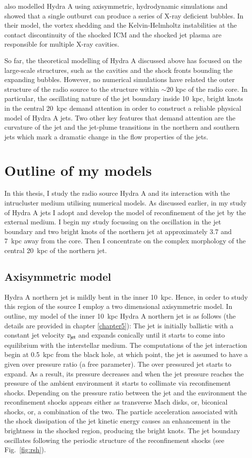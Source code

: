 \citet{rafaelovich12} also modelled Hydra A using axisymmetric, hydrodynamic simulations and showed that a single outburst can produce a series of X-ray deficient bubbles. In their model, the vortex shedding and the Kelvin-Helmholtz instabilities at the contact discontinuity of the shocked ICM and the shocked jet plasma are responsible for multiple X-ray cavities.

So far, the theoretical modelling of Hydra A discussed above has focused on the large-scale structures, such as the cavities and the shock fronts bounding the expanding bubbles. However, no numerical simulations have related the outer structure of the radio source to the structure within $\sim20$ kpc of the radio core. In particular, the oscillating nature of the jet boundary inside 10~kpc, bright knots in the central 20~kpc demand attention in order to construct a reliable physical model of Hydra A jets. Two other key features that demand attention are the curvature of the jet and the jet-plume transitions in the northern and southern jets which mark a dramatic change in the flow properties of the jets.
\section{Outline of my models}\label{int:mod}
In this thesis, I study the radio source Hydra A and its interaction with the intrucluster medium utilising numerical models. As discussed earlier, in my study of Hydra A jets I adopt and develop the model of reconfinement of the jet by the external medium. I begin my study focussing on the oscillation in the jet boundary and two bright knots of the northern jet at approximately 3.7 and 7~kpc away from the core. Then I concentrate on the complex morphology of the central 20~kpc of the northern jet. 
\subsection{Axisymmetric model}
Hydra A northern jet is mildly bent in the inner 10~kpc. Hence, in order to study this region of the source I employ a two dimensional axisymmetric model.  In outline, my model of the inner 10~kpc Hydra A northern jet is as follows (the details are provided in chapter \ref{chapter5}): The jet is initially ballistic with a constant jet velocity $v_{\rm jet}$ and expands conically until it starts to come into equilibrium with the interstellar medium. The computations of the jet interaction begin at 0.5~kpc from the black hole, at which point, the jet is assumed to have a given over pressure ratio (a free parameter). The over pressured jet starts to expand. As a result, its pressure decreases and when the jet pressure reaches the pressure of the ambient environment it starts to collimate via reconfinement shocks. Depending on the pressure ratio between the jet and the environment the reconfinement shocks appears either as transverse Mach disks, or, biconical shocks, or, a combination of the two. The particle acceleration associated with the shock dissipation of the jet kinetic energy causes an enhancement in the brightness in the shocked region, producing the bright knots. The jet boundary oscillates following the periodic structure of the reconfinement shocks (see Fig.~\ref{fig:rsh}).
 
